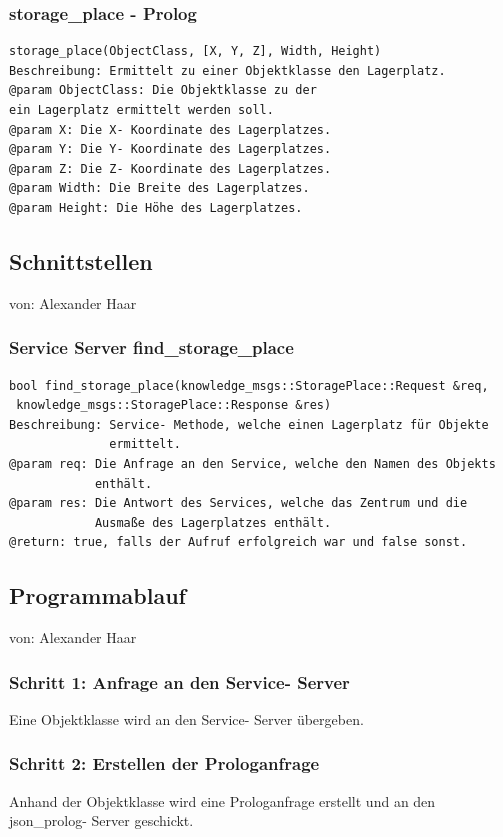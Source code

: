 \documentclass{suturo}
\makeatletter
\newcommand{\chapterauthor}[1]{%
  {\parindent0pt\vspace*{-27pt}%
  \linespread{0}\small\begin{flushright}von: #1\end{flushright}%
  \par\nobreak\vspace*{0pt}}
  \@afterheading%
}
\makeatother
\begin{document}
\subsubsection{storage\_place - Prolog}
\begin{verbatim}
storage_place(ObjectClass, [X, Y, Z], Width, Height)
Beschreibung: Ermittelt zu einer Objektklasse den Lagerplatz.
@param ObjectClass: Die Objektklasse zu der
ein Lagerplatz ermittelt werden soll.
@param X: Die X- Koordinate des Lagerplatzes.
@param Y: Die Y- Koordinate des Lagerplatzes.
@param Z: Die Z- Koordinate des Lagerplatzes.
@param Width: Die Breite des Lagerplatzes.
@param Height: Die Höhe des Lagerplatzes.
\end{verbatim}\label{func:estimateplaneindices}

\subsection{Schnittstellen}
\chapterauthor{Alexander Haar}

\subsubsection{Service Server find\_storage\_place}
\begin{verbatim}
bool find_storage_place(knowledge_msgs::StoragePlace::Request &req,
 knowledge_msgs::StoragePlace::Response &res)
Beschreibung: Service- Methode, welche einen Lagerplatz für Objekte 
              ermittelt.
@param req: Die Anfrage an den Service, welche den Namen des Objekts 
            enthält.  
@param res: Die Antwort des Services, welche das Zentrum und die 
            Ausmaße des Lagerplatzes enthält.
@return: true, falls der Aufruf erfolgreich war und false sonst.
\end{verbatim}\label{func:findcluster}

\subsection{Programmablauf}
\chapterauthor{Alexander Haar}
\subsubsection{Schritt 1: Anfrage an den Service- Server}
Eine Objektklasse wird an den Service- Server übergeben.
\subsubsection{Schritt 2: Erstellen der Prologanfrage}
Anhand der Objektklasse wird eine Prologanfrage erstellt und an den json\_prolog- Server geschickt.
\end{document}
